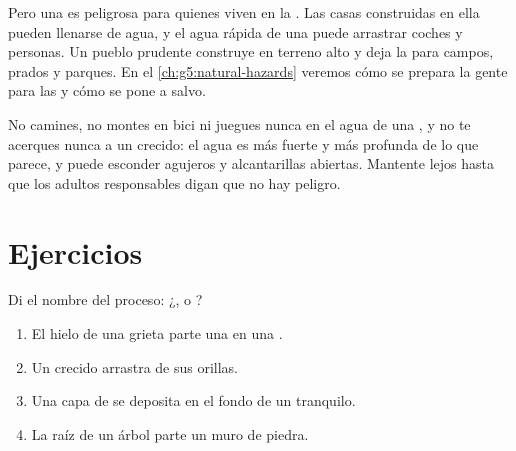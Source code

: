 Pero una  es peligrosa para quienes viven en la . Las casas construidas en ella pueden llenarse de agua, y el
agua rápida de una  puede arrastrar coches y personas. Un pueblo
prudente construye en terreno alto y deja la  para
campos, prados y parques. En el \cref{ch:g5:natural-hazards} veremos cómo
se prepara la gente para las  y cómo se pone a salvo.

\begin{safety}
No camines, no montes en bici ni juegues nunca en el agua de una
, y no te acerques nunca a un  crecido: el agua es más fuerte y
más profunda de lo que parece, y puede esconder agujeros y alcantarillas
abiertas. Mantente lejos hasta que los adultos responsables digan que no
hay peligro.
\end{safety}

\section{Ejercicios}

\begin{exercise}[$\star$]\label{exo:g5:water-shapes-the-land:1}
Di el nombre del proceso: ¿,  o ?
\begin{enumerate}
  \item[(a)] El hielo de una grieta parte una  en una .
  \item[(b)] Un  crecido arrastra  de sus orillas.
  \item[(c)] Una capa de  se deposita en el fondo de un  tranquilo.
  \item[(d)] La raíz de un árbol parte un muro de piedra.
\end{enumerate}
\end{exercise}


